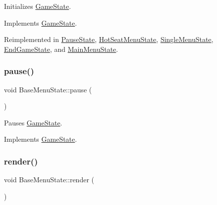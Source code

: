 Initializes \mbox{\hyperlink{class_game_state}{Game\+State}}. 



Implements \mbox{\hyperlink{class_game_state_a10b6e6bb31591c70d08ffcee5f29fa81}{Game\+State}}.



Reimplemented in \mbox{\hyperlink{class_pause_state_a1e3378e3a16fc37c87c12f854d86005b}{Pause\+State}}, \mbox{\hyperlink{class_hot_seat_menu_state_a29beb4656c180d0cfc3b8ca20ae2d172}{Hot\+Seat\+Menu\+State}}, \mbox{\hyperlink{class_single_menu_state_a9494d848c97fe4d406f122f3d97bc38d}{Single\+Menu\+State}}, \mbox{\hyperlink{class_end_game_state_ac3abeb54305351ce65b66d519ca3e0c1}{End\+Game\+State}}, and \mbox{\hyperlink{class_main_menu_state_a83efff7f63145d55d1937e76970d2a25}{Main\+Menu\+State}}.

\mbox{\label{class_base_menu_state_a3ac8e688220c609b467ca4ae4c6600d6}} 
\subsubsection{\texorpdfstring{pause()}{pause()}}
{\footnotesize\ttfamily void Base\+Menu\+State\+::pause (\begin{DoxyParamCaption}{ }\end{DoxyParamCaption})\hspace{0.3cm}{\ttfamily [virtual]}}



Pauses \mbox{\hyperlink{class_game_state}{Game\+State}}. 



Implements \mbox{\hyperlink{class_game_state_aafc908582760099891b37bb380ddd87a}{Game\+State}}.

\mbox{\label{class_base_menu_state_a404076aa3e789fa75ba1bfe7752c1e18}} 
\subsubsection{\texorpdfstring{render()}{render()}}
{\footnotesize\ttfamily void Base\+Menu\+State\+::render (\begin{DoxyParamCaption}\item[{\mbox{\hyperlink{class_game_engine}{Game\+Engine}} $\ast$}]{ }\end{DoxyParamCaption})\hspace{0.3cm}{\ttfamily [virtual]}}



